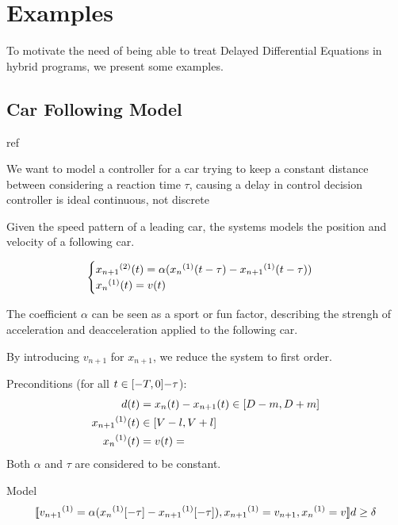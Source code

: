 \chapter{Examples}\label{sec:example-hp}

To motivate the need of being able to treat Delayed Differential Equations in hybrid programs, we present some examples.

\section{Car Following Model}

    ref

    We want to model a controller for a car
    trying to keep a constant distance between
    considering a reaction time $\tau$, causing a delay in control decision
    controller is ideal continuous, not discrete

    Given the speed pattern of a leading car, the systems models the position and velocity of a following car.

    \begin{equation*}
        \begin{cases}
            \D[2]{x_{n+1}}(t) = \alpha (\D{x_n}(t-\tau)-\D{x_{n+1}}(t-\tau))\\
            \D{x_n}(t) = v(t)
        \end{cases}
    \end{equation*}

    The coefficient $\alpha$ can be seen as a sport or fun factor, describing the strengh of acceleration and deacceleration applied to the following car.

    By introducing $v_{n+1}$ for $x_{n+1}$, we reduce the system to first order.

    Preconditions (for all $t\in[-T,0]{-\tau}$):
    \begin{align*}
        d(t) &= x_n(t)-x_{n+1}(t) \in\compactum{D-m}{D+m}\\
        \D{x_{n+1}}(t) &\in\compactum{V-l}{V+l}\\
        \D{x_n}(t) &= v(t) = 
    \end{align*}
    Both $\alpha$ and $\tau$ are considered to be constant.

    Model
    \begin{equation*}
        \dbox{\hevolve{
            \D{v_{n+1}} = \alpha(\D{x_n}[-\tau]-\D{x_{n+1}}[-\tau])\syssep
            \D{x_{n+1}} = v_{n+1}\syssep
            \D{x_n} = v
        }}{d\geq\delta}
    \end{equation*}

